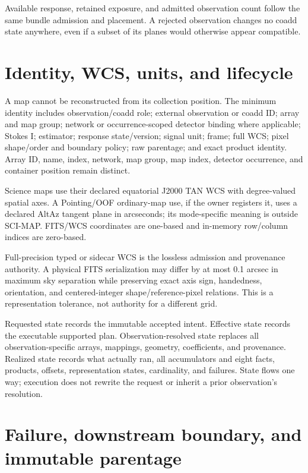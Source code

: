 \documentclass[10pt]{article}
\begin{document}
Available response, retained exposure, and admitted observation count follow
the same bundle admission and placement. A rejected observation changes no
coadd state anywhere, even if a subset of its planes would otherwise appear
compatible.

\clearpage
\section{Identity, WCS, units, and lifecycle}

A map cannot be reconstructed from its collection position. The minimum
identity includes observation/coadd role; external observation or coadd ID;
array and map group; network or occurrence-scoped detector binding where
applicable; Stokes I; estimator; response state/version; signal unit; frame;
full WCS; pixel shape/order and boundary policy; raw parentage; and exact
product identity. Array ID, name, index, network, map group, map index,
detector occurrence, and container position remain distinct.

Science maps use their declared equatorial J2000 TAN WCS with degree-valued
spatial axes. A Pointing/OOF ordinary-map use, if the owner registers it, uses
a declared AltAz tangent plane in arcseconds; its mode-specific meaning is
outside SCI-MAP. FITS/WCS coordinates are one-based and in-memory row/column
indices are zero-based.

Full-precision typed or sidecar WCS is the lossless admission and provenance
authority. A physical FITS serialization may differ by at most 0.1 arcsec in
maximum sky separation while preserving exact axis sign, handedness,
orientation, and centered-integer shape/reference-pixel relations. This is a
representation tolerance, not authority for a different grid.

Requested state records the immutable accepted intent. Effective state records
the executable supported plan. Observation-resolved state replaces all
observation-specific arrays, mappings, geometry, coefficients, and provenance.
Realized state records what actually ran, all accumulators and eight facts,
products, offsets, representation states, cardinality, and failures. State
flows one way; execution does not rewrite the request or inherit a prior
observation's resolution.

\clearpage
\section{Failure, downstream boundary, and immutable parentage}
\end{document}
